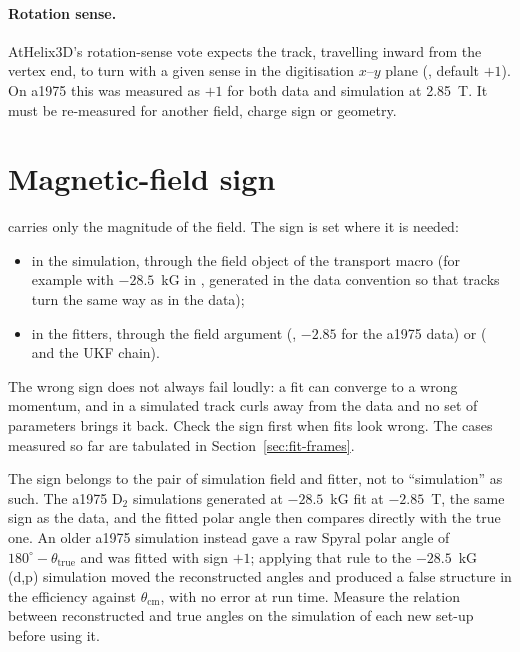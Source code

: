 \paragraph{Rotation sense.} AtHelix3D's rotation-sense vote expects the track, travelling inward from the vertex end,
to turn with a given sense in the digitisation $x$--$y$ plane (, default $+1$). On a1975 this
was measured as $+1$ for both data and simulation at 2.85~T. It must be re-measured for another field, charge sign or
geometry.

\section{Magnetic-field sign}

 carries only the magnitude of the field. The sign is set where it is needed:
\begin{itemize}
\item in the simulation, through the field object of the transport macro (for example
   with $-28.5$~kG in , generated in the data
  convention so that tracks turn the same way as in the data);
\item in the fitters, through the field argument (, $-2.85$ for the a1975 data) or
   ( and the UKF chain).
\end{itemize}
The wrong sign does not always fail loudly: a fit can converge to a wrong momentum, and in  a
simulated track curls away from the data and no set of parameters brings it back. Check the sign first when fits look
wrong. The cases measured so far are tabulated in Section~\ref{sec:fit-frames}.

The sign belongs to the pair of simulation field and fitter, not to ``simulation'' as such. The a1975 D$_2$
simulations generated at $-28.5$~kG fit at $-2.85$~T, the same sign as the data, and the fitted polar angle then
compares directly with the true one. An older a1975 simulation instead gave a raw Spyral polar angle of
$180^\circ - \theta_\mathrm{true}$ and was fitted with sign $+1$; applying that rule to the $-28.5$~kG (d,p) simulation
moved the reconstructed angles and produced a false structure in the efficiency against $\theta_\mathrm{cm}$, with no
error at run time. Measure the relation between reconstructed and true angles on the simulation of each new set-up
before using it.

